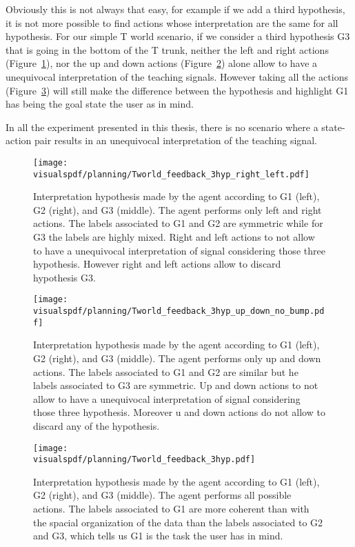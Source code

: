 Obviously this is not always that easy, for example if we add a third hypothesis, it is not more possible to find actions whose interpretation are the same for all hypothesis. For our simple T world scenario, if we consider a third hypothesis G3 that is going in the bottom of the T trunk, neither the left and right actions (Figure~\ref{fig:planning3hyprightleft}), nor the up and down actions (Figure~\ref{fig:planning3hypupdown}) alone allow to have a unequivocal interpretation of the teaching signals. However taking all the actions (Figure~\ref{fig:planning3hyp}) will still make the difference between the hypothesis and highlight G1 has being the goal state the user as in mind.

In all the experiment presented in this thesis, there is no scenario where a state-action pair results in an unequivocal interpretation of the teaching signal. 

\begin{figure}[!htbp]
  \centering
  \texttt{[image: \\visualspdf/planning/Tworld\_feedback\_3hyp\_right\_left.pdf]}
  \caption{Interpretation hypothesis made by the agent according to G1 (left), G2 (right), and G3 (middle). The agent performs only left and right actions. The labels associated to G1 and G2 are symmetric while for G3 the labels are highly mixed. Right and left actions to not allow to have a unequivocal interpretation of signal considering those three hypothesis. However right and left actions allow to discard hypothesis G3.}
  \label{fig:planning3hyprightleft}
\end{figure}

\begin{figure}[!htbp]
  \centering
  \texttt{[image: \\visualspdf/planning/Tworld\_feedback\_3hyp\_up\_down\_no\_bump.pdf]}
  \caption{Interpretation hypothesis made by the agent according to G1 (left), G2 (right), and G3 (middle). The agent performs only up and down actions. The labels associated to G1 and G2 are similar but he labels associated to G3 are symmetric. Up and down actions to not allow to have a unequivocal interpretation of signal considering those three hypothesis. Moreover u and down actions do not allow to discard any of the hypothesis.}
  \label{fig:planning3hypupdown}
\end{figure}

\begin{figure}[H]
  \centering
  \texttt{[image: \\visualspdf/planning/Tworld\_feedback\_3hyp.pdf]}
  \caption{Interpretation hypothesis made by the agent according to G1 (left), G2 (right), and G3 (middle). The agent performs all possible actions. The labels associated to G1 are more coherent than with the spacial organization of the data than the labels associated to G2 and G3, which tells us G1 is the task the user has in mind.}
  \label{fig:planning3hyp}
\end{figure}

